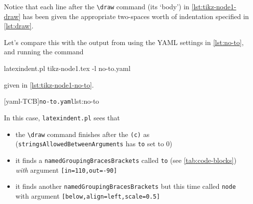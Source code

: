 	Notice that each line after the \lstinline!\draw! command (its `body') in \cref{lst:tikz-node1-draw} has been given the
	appropriate two-spaces worth of indentation specified in \cref{lst:draw}.

	Let's compare this with the output from using the YAML settings in \cref{lst:no-to}, and running the command
	\begin{commandshell}
latexindent.pl tikz-node1.tex -l no-to.yaml  
\end{commandshell}
	given in \cref{lst:tikz-node1-no-to}.

	\begin{minipage}{.45\textwidth}
	\end{minipage}
	\hfill
	\begin{minipage}{.45\textwidth}
		[yaml-TCB]{\texttt{no-to.yaml}}{lst:no-to}
	\end{minipage}

	In this case, \texttt{latexindent.pl} sees that
	\begin{itemize}
		\item the \lstinline!\draw! command finishes after the \lstinline!(c)! as (\texttt{stringsAllowedBetweenArguments} has \texttt{to} set to $0$)
		\item it finds a \texttt{namedGroupingBracesBrackets} called \texttt{to} (see \vref{tab:code-blocks}) \emph{with} argument \lstinline![in=110,out=-90]!
		\item it finds another \texttt{namedGroupingBracesBrackets} but this time called \texttt{node} with argument \lstinline![below,align=left,scale=0.5]!
	\end{itemize}
